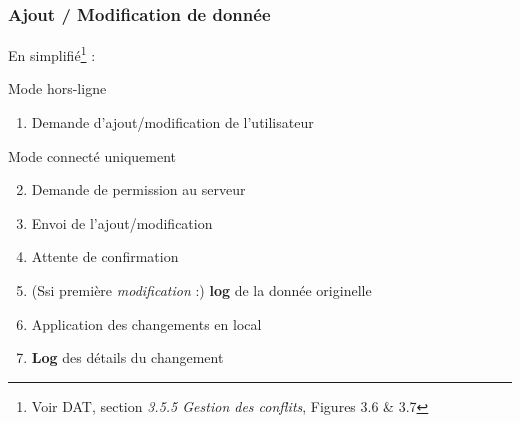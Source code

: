 \begin{frame}
\frametitle{Ajout / Modification de donnée}

En simplifié\footnote{Voir DAT, section \emph{3.5.5 Gestion des conflits}, Figures 3.6 \& 3.7} :

\begin{block}{Mode hors-ligne}
\begin{enumerate}
    \item Demande d'ajout/modification de l'utilisateur
\end{enumerate}
\vspace{-1em}
\hspace*{.05\linewidth}\begin{minipage}{.9\linewidth}
\begin{exampleblock}{Mode connecté uniquement}
\begin{enumerate}
    \setcounter{enumi}{1}
    \item Demande de permission au serveur
    \item Envoi de l'ajout/modification
    \item Attente de confirmation
\end{enumerate}
\end{exampleblock}
\end{minipage}
\begin{enumerate}
\setcounter{enumi}{4}
    \item (Ssi première \emph{modification} :) \textbf{log} de la donnée originelle
    \item Application des changements en local
    \item \textbf{Log} des détails du changement
\end{enumerate}
\end{block}


\end{frame} %

